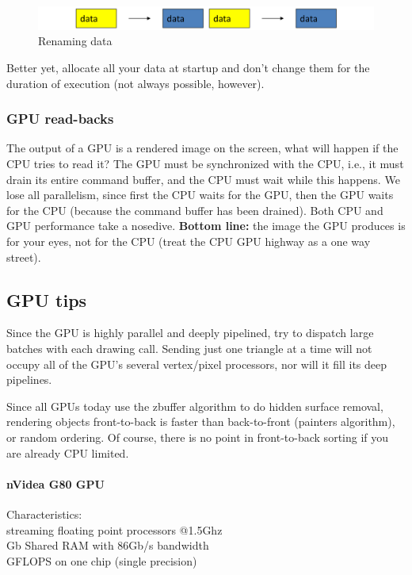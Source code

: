 \begin{figure}[h]
    \centering
    \includegraphics[width=\linewidth]{images/gpu-buffer-renaming-data}
    \caption{Renaming data}
    \label{fig:gpu-buffer-renaming-data}
\end{figure}

Better yet, allocate all your data at startup and don’t
change them for the duration of execution (not always
possible, however).

\subsubsection{GPU read-backs}
The output of a GPU is a rendered image on the screen,
what will happen if the CPU tries to read it?
The GPU must be synchronized with the CPU, i.e., it
must drain its entire command buffer, and the CPU must
wait while this happens.
We lose all parallelism, since first the CPU waits for the
GPU, then the GPU waits for the CPU (because the
command buffer has been drained).
Both CPU and GPU performance take a nosedive.
\textbf{Bottom line:} the image the GPU produces is for your
eyes, not for the CPU (treat the CPU \textrightarrow GPU highway as
a one way street).

\subsection{GPU tips}\label{subsec:gpu-tips}
Since the GPU is highly parallel and deeply pipelined,
try to dispatch large batches with each drawing call.
Sending just one triangle at a time will not occupy all of
the GPU’s several vertex/pixel processors, nor will it fill
its deep pipelines.

Since all GPUs today use the zbuffer algorithm to do
hidden surface removal, rendering objects front-to-back
is faster than back-to-front (painters algorithm), or
random ordering.
Of course, there is no point in front-to-back sorting if you
are already CPU limited.

\paragraph{nVidea G80 GPU} Characteristics:\\
 streaming floating point processors @1.5Ghz\\
 Gb Shared RAM with 86Gb/s bandwidth\\
 GFLOPS on one chip (single precision)

